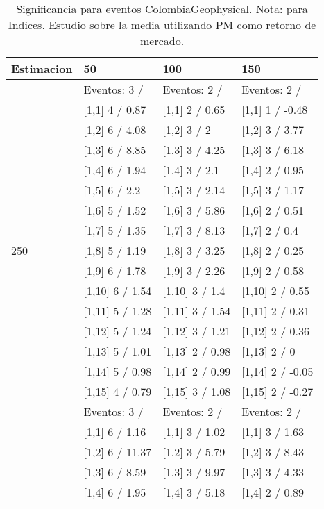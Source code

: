 \begin{table}

\caption{Significancia para eventos ColombiaGeophysical. Nota: para Indices. Estudio sobre la media utilizando PM como retorno de mercado.}
\centering
\begin{tabular}[t]{llll}
\toprule
Estimacion & 50 & 100 & 150\\
\midrule
 & Eventos:  3 / & Eventos:  2 / & Eventos:  2 /\\
 & {}[1,1] 4  / 0.87 & {}[1,1] 2  / 0.65 & {}[1,1] 1  / -0.48\\
 & {}[1,2] 6  / 4.08 & {}[1,2] 3  / 2 & {}[1,2] 3  / 3.77\\
 & {}[1,3] 6  / 8.85 & {}[1,3] 3  / 4.25 & {}[1,3] 3  / 6.18\\
 & {}[1,4] 6  / 1.94 & {}[1,4] 3  / 2.1 & {}[1,4] 2  / 0.95\\
\addlinespace
 & {}[1,5] 6  / 2.2 & {}[1,5] 3  / 2.14 & {}[1,5] 3  / 1.17\\
 & {}[1,6] 5  / 1.52 & {}[1,6] 3  / 5.86 & {}[1,6] 2  / 0.51\\
 & {}[1,7] 5  / 1.35 & {}[1,7] 3  / 8.13 & {}[1,7] 2  / 0.4\\
250 & {}[1,8] 5  / 1.19 & {}[1,8] 3  / 3.25 & {}[1,8] 2  / 0.25\\
 & {}[1,9] 6  / 1.78 & {}[1,9] 3  / 2.26 & {}[1,9] 2  / 0.58\\
\addlinespace
 & {}[1,10] 6  / 1.54 & {}[1,10] 3  / 1.4 & {}[1,10] 2  / 0.55\\
 & {}[1,11] 5  / 1.28 & {}[1,11] 3  / 1.54 & {}[1,11] 2  / 0.31\\
 & {}[1,12] 5  / 1.24 & {}[1,12] 3  / 1.21 & {}[1,12] 2  / 0.36\\
 & {}[1,13] 5  / 1.01 & {}[1,13] 2  / 0.98 & {}[1,13] 2  / 0\\
 & {}[1,14] 5  / 0.98 & {}[1,14] 2  / 0.99 & {}[1,14] 2  / -0.05\\
\addlinespace
 & {}[1,15] 4  / 0.79 & {}[1,15] 3  / 1.08 & {}[1,15] 2  / -0.27\\
 & Eventos:  3 / & Eventos:  2 / & Eventos:  2 /\\
 & {}[1,1] 6  / 1.16 & {}[1,1] 3  / 1.02 & {}[1,1] 3  / 1.63\\
 & {}[1,2] 6  / 11.37 & {}[1,2] 3  / 5.79 & {}[1,2] 3  / 8.43\\
 & {}[1,3] 6  / 8.59 & {}[1,3] 3  / 9.97 & {}[1,3] 3  / 4.33\\
\addlinespace
 & {}[1,4] 6  / 1.95 & {}[1,4] 3  / 5.18 & {}[1,4] 2  / 0.89\\

\end{tabular}
\end{table}
